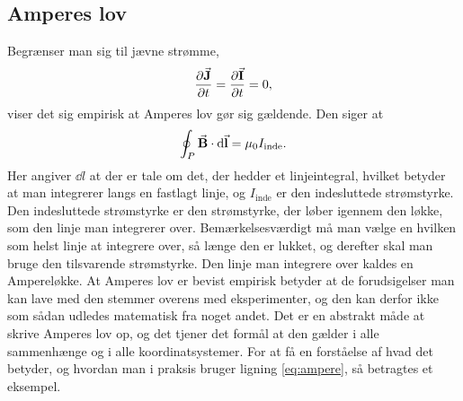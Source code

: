 \subsection{Amperes lov}
Begrænser man sig til jævne strømme,
%
\begin{align}
    \pdv{\va J}{t} = \pdv{\va I}{t} = 0,
\end{align}
%
viser det sig empirisk at Amperes lov gør sig gældende. Den siger at
%
\begin{align} \label{eq:ampere}
    \oint_P \va B \cdot \dd{\va{l}} = \mu_0 I_\mathrm{inde}.
\end{align}
%
Her angiver $\dd l$ at der er tale om det, der hedder et linjeintegral, hvilket betyder at man integrerer langs en fastlagt linje, og $I_\mathrm{inde}$ er den indesluttede strømstyrke. Den indesluttede strømstyrke er den strømstyrke, der løber igennem den løkke, som den linje man integrerer over. Bemærkelsesværdigt må man vælge en hvilken som helst linje at integrere over, så længe den er lukket, og derefter skal man bruge den tilsvarende strømstyrke. Den linje man integrere over kaldes en Ampereløkke. At Amperes lov er bevist empirisk betyder at de forudsigelser man kan lave med den stemmer overens med eksperimenter, og den kan derfor ikke som sådan udledes matematisk fra noget andet. Det er en abstrakt måde at skrive Amperes lov op, og det tjener det formål at den gælder i alle sammenhænge og i alle koordinatsystemer. For at få en forståelse af hvad det betyder, og hvordan man i praksis bruger ligning \eqref{eq:ampere}, så betragtes et eksempel.
%
